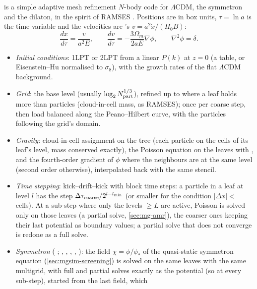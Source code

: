  is a simple adaptive mesh refinement $N$-body code for $\Lambda$CDM, the symmetron and the dilaton, in the spirit of
RAMSES \cite{Teyssier2002}. Positions are in box units, $\tau=\ln a$ is the time variable and the velocities are
\fml{}'s $v=a^2\dot x/(H_0B)$:
\begin{equation}
\frac{dx}{d\tau}=\frac{v}{a^2E},\qquad\frac{dv}{d\tau}=-\frac{3\Omega_m}{2aE}\nabla\phi,\qquad\nabla^2\phi=\delta .
\end{equation}
\begin{itemize}
\item \emph{Initial conditions}: 1LPT or 2LPT from a linear $P(k)$ at $z=0$ (a table, or Eisenstein--Hu normalised to
      $\sigma_8$), with the growth rates of the flat $\Lambda$CDM background.
\item \emph{Grid}: the base level  (usually $\log_2 N_{\rm part}^{1/3}$), refined up to 
      where a leaf holds more than  particles (cloud-in-cell mass, as RAMSES); once per coarse step,
      then load balanced along the Peano--Hilbert curve, with the particles following the grid's domain.
\item \emph{Gravity}: cloud-in-cell assignment on the tree (each particle on the cells of its leaf's level, mass
      conserved exactly), the Poisson equation on the leaves with , and the fourth-order
      gradient of $\phi$ where the neighbours are at the same level (second order otherwise), interpolated back with the
      same stencil.
\item \emph{Time stepping}: kick--drift--kick with block time steps: a particle in a leaf at level $l$ has the step
      $\Delta\tau_{\rm coarse}/2^{l-l_{\rm min}}$ (or smaller for the condition $|\Delta x|<$\, cells). At a
      sub-step where only the levels $\geq L$ are active, Poisson is solved only on those leaves (a partial solve,
      \cref{sec:mg-amr}), the coarser ones keeping their last potential as boundary values; a partial solve that does not
      converge is redone as a full solve.
\item \emph{Symmetron} ( ; , ,
      , , ): the field $\chi=\phi/\phi_*$ of the
      quasi-static symmetron equation (\cref{sec:mgsim-screening}) is solved on the same leaves with the same multigrid,
      with full and partial solves exactly as the potential (so at every sub-step), started from the last field, which

\end{itemize}
